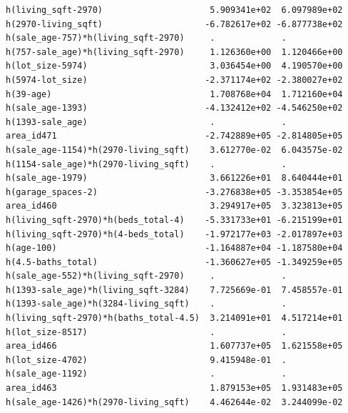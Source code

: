 \documentclass[
]{article}
\begin{document}
\begin{verbatim}
h(living_sqft-2970)                     5.909341e+02  6.097989e+02
h(2970-living_sqft)                    -6.782617e+02 -6.877738e+02
h(sale_age-757)*h(living_sqft-2970)     .             .           
h(757-sale_age)*h(living_sqft-2970)     1.126360e+00  1.120466e+00
h(lot_size-5974)                        3.036454e+00  4.190570e+00
h(5974-lot_size)                       -2.371174e+02 -2.380027e+02
h(39-age)                               1.708768e+04  1.712160e+04
h(sale_age-1393)                       -4.132412e+02 -4.546250e+02
h(1393-sale_age)                        .             .           
area_id471                             -2.742889e+05 -2.814805e+05
h(sale_age-1154)*h(2970-living_sqft)    3.612770e-02  6.043575e-02
h(1154-sale_age)*h(2970-living_sqft)    .             .           
h(sale_age-1979)                        3.661226e+01  8.640444e+01
h(garage_spaces-2)                     -3.276838e+05 -3.353854e+05
area_id460                              3.294917e+05  3.323813e+05
h(living_sqft-2970)*h(beds_total-4)    -5.331733e+01 -6.215199e+01
h(living_sqft-2970)*h(4-beds_total)    -1.972177e+03 -2.017897e+03
h(age-100)                             -1.164887e+04 -1.187580e+04
h(4.5-baths_total)                     -1.360627e+05 -1.349259e+05
h(sale_age-552)*h(living_sqft-2970)     .             .           
h(1393-sale_age)*h(living_sqft-3284)    7.725669e-01  7.458557e-01
h(1393-sale_age)*h(3284-living_sqft)    .             .           
h(living_sqft-2970)*h(baths_total-4.5)  3.214091e+01  4.517214e+01
h(lot_size-8517)                        .             .           
area_id466                              1.607737e+05  1.621558e+05
h(lot_size-4702)                        9.415948e-01  .           
h(sale_age-1192)                        .             .           
area_id463                              1.879153e+05  1.931483e+05
h(sale_age-1426)*h(2970-living_sqft)    4.462644e-02  3.244099e-02
                                                                  

\end{verbatim}
\end{document}
